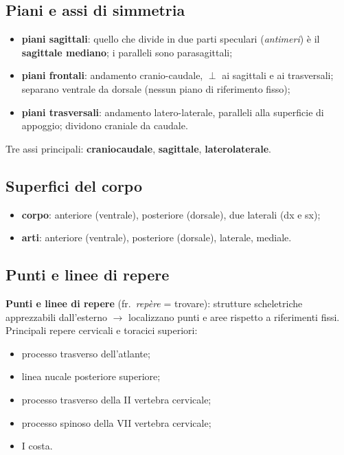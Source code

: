 \subsection{Piani e assi di simmetria}
\begin{itemize}
  \item \textbf{piani sagittali}: quello che divide in due parti speculari (\textit{antimeri}) è il
    \textbf{sagittale mediano}; i paralleli sono parasagittali;
  \item \textbf{piani frontali}: andamento cranio-caudale, $\perp$ ai sagittali e ai trasversali;
    separano ventrale da dorsale (nessun piano di riferimento fisso);
  \item \textbf{piani trasversali}: andamento latero-laterale, paralleli alla superficie di
    appoggio; dividono craniale da caudale.
\end{itemize}
Tre assi principali: \textbf{craniocaudale}, \textbf{sagittale}, \textbf{laterolaterale}.

\subsection{Superfici del corpo}
\begin{itemize}
  \item \textbf{corpo}: anteriore (ventrale), posteriore (dorsale), due laterali (dx e sx);
  \item \textbf{arti}: anteriore (ventrale), posteriore (dorsale), laterale, mediale.
\end{itemize}

\subsection{Punti e linee di repere}
\textbf{Punti e linee di repere} (fr.\ \textit{repère} = trovare): strutture scheletriche
apprezzabili dall'esterno $\rightarrow$ localizzano punti e aree rispetto a riferimenti fissi.
Principali repere cervicali e toracici superiori:
\begin{itemize}
  \item processo trasverso dell'atlante;
  \item linea nucale posteriore superiore;
  \item processo trasverso della II vertebra cervicale;
  \item processo spinoso della VII vertebra cervicale;
  \item I costa.
\end{itemize}

